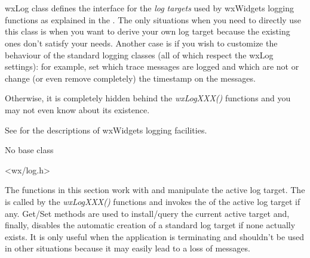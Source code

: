 
\section{}\label{wxlog}

wxLog class defines the interface for the {\it log targets} used by wxWidgets
logging functions as explained in the .
The only situations when you need to directly use this class is when you want
to derive your own log target because the existing ones don't satisfy your
needs. Another case is if you wish to customize the behaviour of the standard
logging classes (all of which respect the wxLog settings): for example, set
which trace messages are logged and which are not or change (or even remove
completely) the timestamp on the messages.

Otherwise, it is completely hidden behind the {\it wxLogXXX()} functions and
you may not even know about its existence.

See  for the descriptions of wxWidgets
logging facilities.


No base class


<wx/log.h>



The functions in this section work with and manipulate the active log target.
The  is called by the {\it wxLogXXX()} functions
and invokes the  of the active log target if any.
Get/Set methods are used to install/query the current active target and,
finally,  disables the
automatic creation of a standard log target if none actually exists. It is
only useful when the application is terminating and shouldn't be used in other
situations because it may easily lead to a loss of messages.


